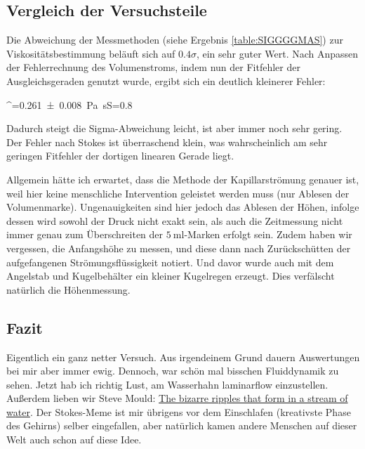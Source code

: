 \subsection{Vergleich der Versuchsteile}
Die Abweichung der Messmethoden (siehe Ergebnis \ref{table:SIGGGGMAS}) zur Viskositätsbestimmung beläuft sich auf \(0.4\sigma\), ein sehr guter Wert. Nach Anpassen der Fehlerrechnung des Volumenstroms, indem nun der Fitfehler der Ausgleichsgeraden genutzt wurde, ergibt sich ein deutlich kleinerer Fehler: 
\begin{rb}
    \eta^=\qty{0.261(8)}{\pascal\s}\qquad S=0.8\sigma
\end{rb}
Dadurch steigt die Sigma-Abweichung leicht, ist aber immer noch sehr gering.\\
Der Fehler nach Stokes ist überraschend klein, was wahrscheinlich am sehr geringen Fitfehler der dortigen linearen Gerade liegt. \par
Allgemein hätte ich erwartet, dass die Methode der Kapillarströmung genauer ist, weil hier keine menschliche Intervention geleistet werden muss (nur Ablesen der Volumenmarke). Ungenauigkeiten sind hier jedoch das Ablesen der Höhen, infolge dessen wird sowohl der Druck nicht exakt sein, als auch die Zeitmessung nicht immer genau zum Überschreiten der \(\qty{5}{\milli\litre}\)-Marken erfolgt sein. Zudem haben wir vergessen, die Anfangshöhe zu messen, und diese dann nach Zurückschütten der aufgefangenen Strömungsflüssigkeit notiert. Und davor wurde auch mit dem Angelstab und Kugelbehälter ein kleiner Kugelregen erzeugt. Dies verfälscht natürlich die Höhenmessung.
\subsection{Fazit}
Eigentlich ein ganz netter Versuch. Aus irgendeinem Grund dauern Auswertungen bei mir aber immer ewig. Dennoch, war schön mal bisschen Fluiddynamik zu sehen. Jetzt hab ich richtig Lust, am Wasserhahn laminarflow einzustellen. Außerdem lieben wir Steve Mould: \href{https://youtu.be/DvtbQs7hWXw?si=EIpQsjLarLjOJoeB&t=209}{ The bizarre ripples that form in a stream of water}. Der Stokes-Meme ist mir übrigens vor dem Einschlafen (kreativste Phase des Gehirns) selber eingefallen, aber natürlich kamen andere Menschen auf dieser Welt auch schon auf diese Idee.
